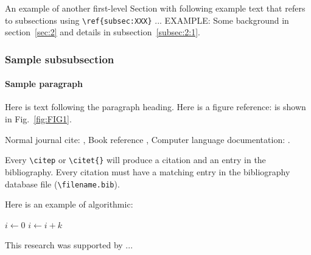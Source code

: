 An example of another first-level Section with following example text that refers to subsections using
\verb+\ref{subsec:XXX}+ ...  EXAMPLE: Some background in
section~\ref{sec:2} and details  in subsection~\ref{subsec:2:1}.



   \subsubsection{Sample subsubsection\label{subsubsec:1}}

\paragraph{Sample paragraph}Here is text following the paragraph
heading.
Here is a figure reference: is shown in Fig.~\ref{fig:FIG1}.



Normal journal cite: \citep{joursamp1},
 Book reference \citet{booksamp1},
Computer language documentation:
\citep{sampcode2}.

Every \verb+\citep+  or \verb+\citet{}+ will produce a citation and an entry in the
bibliography. Every citation must have a matching entry in the
bibliography
database file (\verb+\filename.bib+).


Here is an example of algorithmic:


\begin{algorithmic}
    \State $i\gets 0$
\Else
        \State $i\gets i+k$
    \EndIf
\EndIf
\end{algorithmic}


\begin{acknowledgments}
This research was supported by  ...
\end{acknowledgments}



